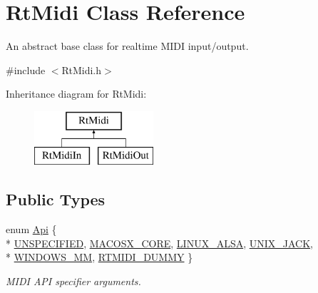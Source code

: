 \hypertarget{class_rt_midi}{}\section{Rt\+Midi Class Reference}
\label{class_rt_midi}


An abstract base class for realtime M\+I\+DI input/output.  




{\ttfamily \#include $<$Rt\+Midi.\+h$>$}

Inheritance diagram for Rt\+Midi\+:\begin{figure}[H]
\begin{center}
\leavevmode
\includegraphics[height=2.000000cm]{class_rt_midi}
\end{center}
\end{figure}
\subsection*{Public Types}
\begin{DoxyCompactItemize}
\item 
enum \hyperlink{class_rt_midi_aac66af04a85fe5c5f07c360574a19406}{Api} \{ \\*
\hyperlink{class_rt_midi_aac66af04a85fe5c5f07c360574a19406a4a4d9f7a38a082d6b0d5dd2b5de94ab9}{U\+N\+S\+P\+E\+C\+I\+F\+I\+ED}, 
\hyperlink{class_rt_midi_aac66af04a85fe5c5f07c360574a19406a3f41293f89467641484fbd54c4530908}{M\+A\+C\+O\+S\+X\+\_\+\+C\+O\+RE}, 
\hyperlink{class_rt_midi_aac66af04a85fe5c5f07c360574a19406a20c691b24844d3ab5dbf882123235df2}{L\+I\+N\+U\+X\+\_\+\+A\+L\+SA}, 
\hyperlink{class_rt_midi_aac66af04a85fe5c5f07c360574a19406a1f59daf3120f47c0ae3891773112ddfa}{U\+N\+I\+X\+\_\+\+J\+A\+CK}, 
\\*
\hyperlink{class_rt_midi_aac66af04a85fe5c5f07c360574a19406a647868cb4ed37f517bf185a7f41cb70f}{W\+I\+N\+D\+O\+W\+S\+\_\+\+MM}, 
\hyperlink{class_rt_midi_aac66af04a85fe5c5f07c360574a19406a54dba406ab358492005ce2b966a2d959}{R\+T\+M\+I\+D\+I\+\_\+\+D\+U\+M\+MY}
 \}\begin{DoxyCompactList}\small\item\em M\+I\+DI A\+PI specifier arguments. \end{DoxyCompactList}
\end{DoxyCompactItemize}
